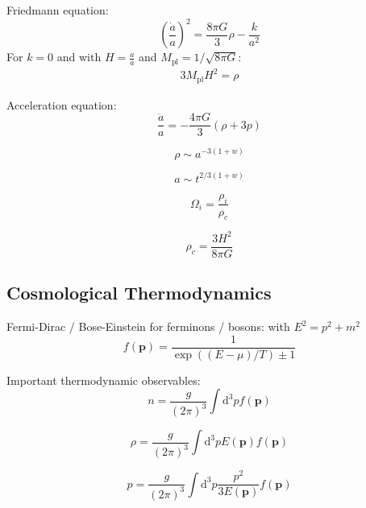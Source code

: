 \documentclass[master,       %
               twoside,        %
               BCOR10mm,       %
               english,ngerman, %
               ]{GAUBM}
\begin{document}
\begin{otherlanguage}{english}
Friedmann equation:
\begin{equation}
	\left( \frac{\dot{a}}{a} \right)^2 = \frac{8 \pi G}{3} \rho - \frac{k}{a^2}
\end{equation}
For $k = 0$ and with $H = \frac{\dot{a}}{a}$ and $M_\mathrm{pl} = 1 / \sqrt{8 \pi G}$:
\begin{align}
	3 M_\mathrm{pl} H^2 = \rho 
\end{align}

Acceleration equation:
\begin{equation}
	\frac{\ddot{a}}{a} = - \frac{4 \pi G}{3} ( \rho + 3 p )
\end{equation}

\begin{equation}
	\rho \sim a^{-3(1 + w)}
\end{equation}

\begin{equation}
	a \sim t^{2/3(1 + w)}
\end{equation}

\begin{equation}
	\Omega_i = \frac{\rho_i}{\rho_c}
\end{equation}

\begin{equation}
	\rho_c = \frac{3 H^2}{8 \pi G}
\end{equation}

\subsection{Cosmological Thermodynamics}
Fermi-Dirac / Bose-Einstein for ferminons / bosons:
with $E^2 = p^2 + m^2$
\begin{equation}
	f(\mathbf{p}) = \frac{1}{\exp((E - \mu) / T) \pm 1}
\end{equation}

Important thermodynamic observables:
\begin{equation}
	n = \frac{g}{(2\pi)^3} \int \mathrm{d}^3 p f(\mathbf{p})
\end{equation}

\begin{equation}
	\rho = \frac{g}{(2\pi)^3} \int \mathrm{d}^3 p E(\mathbf{p}) f(\mathbf{p})
\end{equation}

\begin{equation}
	p = \frac{g}{(2\pi)^3} \int \mathrm{d}^3 p \frac{p^2}{3E(\mathbf{p})} f(\mathbf{p})
\end{equation}


\end{otherlanguage}
\end{document}
